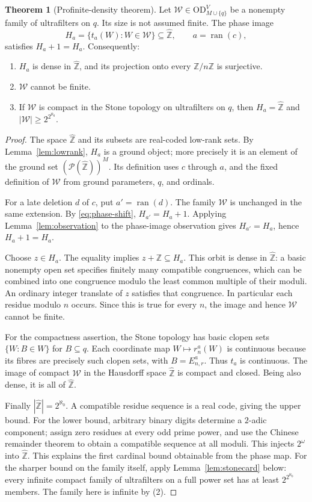 \documentclass[11pt,letterpaper]{article}
\theoremstyle{definition}
\newtheorem{theorem}[definition]{Theorem}
\numberwithin{equation}{section}
\newcommand{\OD}{\mathrm{OD}}
\newcommand{\ran}{\operatorname{ran}}
\newcommand{\ZZ}{\mathbb Z}
\newcommand{\zhat}{\widehat{\mathbb Z}}
\newcommand{\ODg}{\OD_{M\cup\{q\}}^{V}}
\newcommand{\powerset}{\mathcal P}
\begin{document}
\begin{theorem}[Profinite-density theorem]\label{thm:phases}
Let $\mathcal W\in\ODg$ be a nonempty family of ultrafilters on $q$.
Its size is not assumed finite. The phase image
\[
 H_a=\{t_a(W):W\in\mathcal W\}\subseteq\zhat,
 \qquad a=\ran(c),
\]
satisfies $H_a+1=H_a$. Consequently:
\begin{enumerate}
\item $H_a$ is dense in $\zhat$, and its projection onto every
$\ZZ/n\ZZ$ is surjective.
\item $\mathcal W$ cannot be finite.
\item If $\mathcal W$ is compact in the Stone topology on ultrafilters
on $q$, then $H_a=\zhat$ and $|\mathcal W|\ge2^{2^{\aleph_0}}$.
\end{enumerate}
\end{theorem}

\begin{proof}
The space $\zhat$ and its subsets are real-coded low-rank sets. By
Lemma~\ref{lem:lowrank}, $H_a$ is a ground object; more precisely it is an
element of the ground set $(\powerset(\zhat))^M$. Its definition uses
$c$ through $a$, and the fixed definition of $\mathcal W$ from ground
parameters, $q$, and ordinals.

For a late deletion $d$ of $c$, put $a'=\ran(d)$. The family
$\mathcal W$ is unchanged in the same extension. By
\eqref{eq:phase-shift}, $H_{a'}=H_a+1$. Applying
Lemma~\ref{lem:observation} to the phase-image observation gives
$H_{a'}=H_a$, hence $H_a+1=H_a$.

Choose $z\in H_a$. The equality implies $z+\ZZ\subseteq H_a$. This orbit
is dense in $\zhat$: a basic nonempty open set specifies finitely many
compatible congruences, which can be combined into one congruence modulo
the least common multiple of their moduli. An ordinary integer translate
of $z$ satisfies that congruence. In particular each residue modulo $n$
occurs. Since this is true for every $n$, the image and hence
$\mathcal W$ cannot be finite.

For the compactness assertion, the Stone topology has basic clopen sets
$\{W:B\in W\}$ for $B\subseteq q$. Each coordinate map
$W\mapsto r_n^a(W)$ is continuous because its fibres are precisely such
clopen sets, with $B=E^a_{n,r}$. Thus $t_a$ is continuous. The image of
compact $\mathcal W$ in the Hausdorff space $\zhat$ is compact and closed.
Being also dense, it is all of $\zhat$.

Finally $|\zhat|=2^{\aleph_0}$. A compatible residue sequence is a real
code, giving the upper bound. For the lower bound, arbitrary binary digits
determine a $2$-adic component; assign zero residues at every odd prime
power, and use the Chinese remainder theorem to obtain a compatible
sequence at all moduli. This injects $2^\omega$ into $\zhat$.
This explains the first cardinal bound obtainable from the phase map.
For the sharper bound on the family itself, apply
Lemma~\ref{lem:stonecard} below: every infinite compact family of
ultrafilters on a full power set has at least $2^{2^{\aleph_0}}$ members.
The family here is infinite by (2).
\end{proof}
\end{document}
